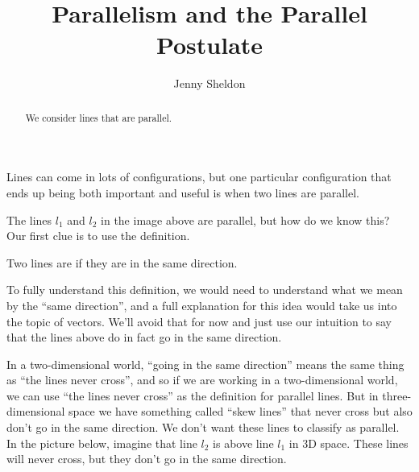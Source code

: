\documentclass{ximera}
\title{Parallelism and the Parallel Postulate}
\author{Jenny Sheldon}
\begin{document}
\begin{abstract}
We consider lines that are parallel.
\end{abstract}
\maketitle

Lines can come in lots of configurations, but one particular configuration that ends up being both important and useful is when two lines are parallel.
\begin{center}
\end{center}


The lines $l_1$ and $l_2$ in the image above are parallel, but how do we know this? Our first clue is to use the definition.
\begin{definition}
	Two lines are  if they are in the same direction.
\end{definition}

To fully understand this definition, we would need to understand what we mean by the ``same direction'', and a full explanation for this idea would take us into the topic of vectors. We'll avoid that for now and just use our intuition to say that the lines above do in fact go in the same direction.

In a two-dimensional world, ``going in the same direction'' means the same thing as ``the lines never cross'', and so if we are working in a two-dimensional world, we can use ``the lines never cross'' as the definition for parallel lines. But in three-dimensional space we have something called ``skew lines'' that never cross but also don't go in the same direction. We don't want these lines to classify as parallel. In the picture below, imagine that line $l_2$ is above line $l_1$ in 3D space. These lines will never cross, but they don't go in the same direction.
\begin{center}
\end{center} 
\end{document}
